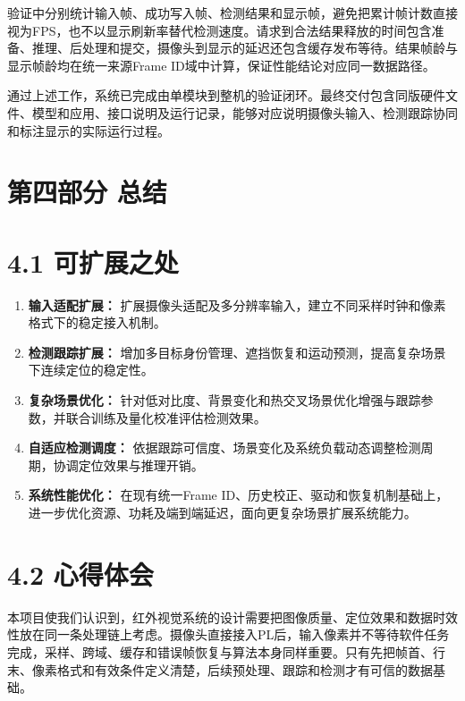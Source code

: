 \documentclass[UTF8,a4paper,12pt,fontset=windows]{ctexart}
\begin{document}
验证中分别统计输入帧、成功写入帧、检测结果和显示帧，避免把累计帧计数直接视为FPS，也不以显示刷新率替代检测速度。请求到合法结果释放的时间包含准备、推理、后处理和提交，摄像头到显示的延迟还包含缓存发布等待。结果帧龄与显示帧龄均在统一来源Frame ID域中计算，保证性能结论对应同一数据路径。

通过上述工作，系统已完成由单模块到整机的验证闭环。最终交付包含同版硬件文件、模型和应用、接口说明及运行记录，能够对应说明摄像头输入、检测跟踪协同和标注显示的实际运行过程。


\section*{第四部分 总结}

\section*{4.1 可扩展之处}

\begin{enumerate}
    \item \textbf{输入适配扩展：}
    扩展摄像头适配及多分辨率输入，建立不同采样时钟和像素格式下的稳定接入机制。

\item \textbf{检测跟踪扩展：}
    增加多目标身份管理、遮挡恢复和运动预测，提高复杂场景下连续定位的稳定性。

    \item \textbf{复杂场景优化：}
    针对低对比度、背景变化和热交叉场景优化增强与跟踪参数，并联合训练及量化校准评估检测效果。

    

    \item \textbf{自适应检测调度：}
    依据跟踪可信度、场景变化及系统负载动态调整检测周期，协调定位效果与推理开销。

    \item \textbf{系统性能优化：}
    在现有统一Frame ID、历史校正、驱动和恢复机制基础上，进一步优化资源、功耗及端到端延迟，面向更复杂场景扩展系统能力。
\end{enumerate}


\section*{4.2 心得体会}

本项目使我们认识到，红外视觉系统的设计需要把图像质量、定位效果和数据时效性放在同一条处理链上考虑。摄像头直接接入PL后，输入像素并不等待软件任务完成，采样、跨域、缓存和错误帧恢复与算法本身同样重要。只有先把帧首、行末、像素格式和有效条件定义清楚，后续预处理、跟踪和检测才有可信的数据基础。
\end{document}
